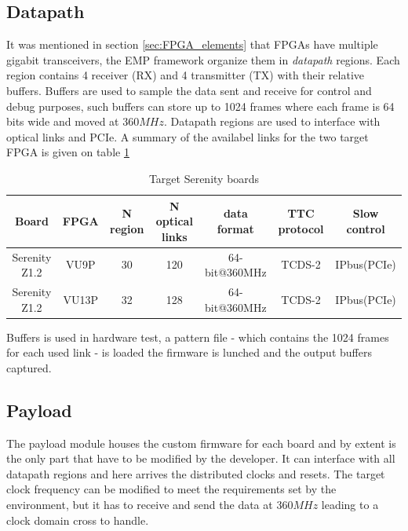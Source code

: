 \documentclass[../../main.tex]{subfiles}
\begin{document}
\subsection{Datapath}
\label{sec:EMP-data}
It was mentioned in section \ref{sec:FPGA_elements} that FPGAs have multiple gigabit transceivers, the EMP framework organize them in \textit{datapath} regions. Each region contains 4 receiver (RX) and 4 transmitter (TX) with their relative buffers. Buffers are used to sample the data sent and receive for control and debug purposes, such buffers can store up to 1024 frames where each frame is 64 bits wide and moved at 360$MHz$. Datapath regions are used to interface with optical links and PCIe.  
A summary of the availabel links for the two target FPGA is given on table \ref{tab:EMP-link}

\begin{center}
    \begin{table}[h]
    \begin{tabular}{|c|c|c|c|c|c|c|}
        \hline
        Board & FPGA & N region & N optical links & data format & TTC protocol & Slow control  \\ 
        \hline \hline
        Serenity Z1.2 & VU9P  & 30  & 120 & 64-bit@360MHz & TCDS-2 & IPbus(PCIe)  \\
        Serenity Z1.2 & VU13P & 32  & 128 & 64-bit@360MHz & TCDS-2 & IPbus(PCIe)  \\
        \hline
    \end{tabular}
    \caption{Target Serenity boards}
    \label{tab:EMP-link}
    \end{table}
\end{center}

Buffers is used in hardware test, a pattern file - which contains the 1024 frames for each used link - is loaded the firmware is lunched and the output buffers captured.  

\subsection{Payload}
\label{sec:EMP-data}
The payload module houses the custom firmware for each board and by extent is the only part that have to be modified by the developer. It can interface with all datapath regions and here arrives the distributed clocks and resets. The target clock frequency can be modified to meet the requirements set by the environment, but it has to receive and send the data at 360$MHz$ leading to a clock domain cross to handle. 
\end{document}

